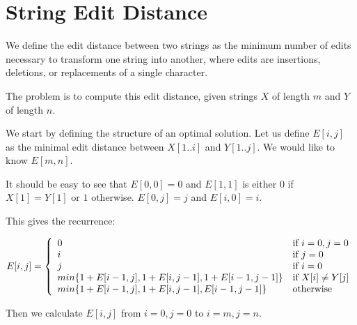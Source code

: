 \section{String Edit Distance}

We define the edit distance between two strings as the minimum number
of edits necessary to transform one string into another, where edits
are insertions, deletions, or replacements of a single character.

The problem is to compute this edit distance, given strings $X$ of
length $m$ and $Y$ of length $n$.

We start by defining the structure of an optimal solution.  Let us
define $E[i,j]$ as the minimal edit distance between $X[1..i]$ and
$Y[1..j]$.  We would like to know $E[m,n]$.

It should be easy to see that $E[0,0] = 0$ and $E[1,1]$ is either $0$
if $X[1] = Y[1]$ or $1$ otherwise.  $E[0,j] = j$ and $E[i,0] = i$.

This gives the recurrence:

\begin{math}
  E[i,j] = \left\{
    \begin{array}{l l}
      0 & \text{if } i=0,j=0 \\
      i & \text{if } j=0 \\
      j & \text{if } i=0 \\
      min \{ 1 + E[i-1,j], 1 + E[i,j-1], 1 + E[i-1,j-1] \} & \text{if } X[i] \neq Y[j] \\
      min \{ 1 + E[i-1,j], 1 + E[i,j-1], E[i-1,j-1] \} & \text{otherwise} \\
    \end{array} \right.
\end{math}

Then we calculate $E[i,j]$ from $i=0,j=0$ to $i=m,j=n$.


